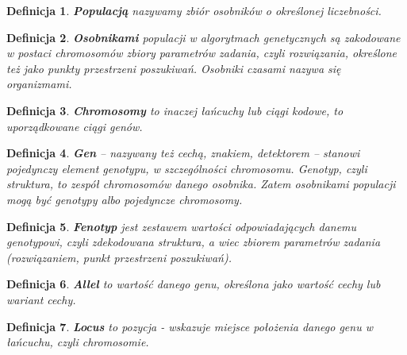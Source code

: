 \documentclass[twoside,12pt]{report}
\newtheorem{definition}{Definicja} %
\begin{document}
\begin{definition}
\textbf{Populacją} nazywamy zbiór osobników o określonej liczebności.
\end{definition}

\vspace*{10px}

\begin{definition}
\textbf{Osobnikami} populacji w algorytmach genetycznych są zakodowane w postaci chromosomów zbiory parametrów zadania, czyli rozwiązania, określone też jako punkty
przestrzeni poszukiwań. Osobniki czasami nazywa się organizmami.
\end{definition}

\vspace*{10px}

\begin{definition}
\textbf{Chromosomy} to inaczej łańcuchy lub ciągi kodowe, to uporządkowane ciągi genów.
\end{definition}

\vspace*{10px}

\begin{definition}
\textbf{Gen} – nazywany też cechą, znakiem, detektorem – stanowi pojedynczy element
genotypu, w szczególności chromosomu. Genotyp, czyli struktura, to zespół chromosomów
danego osobnika. Zatem osobnikami populacji mogą być genotypy albo
pojedyncze chromosomy.
\end{definition}

\vspace*{10px}

\begin{definition}
\textbf{Fenotyp} jest zestawem wartości odpowiadających danemu genotypowi, czyli zdekodowana
struktura, a wiec zbiorem parametrów zadania (rozwiązaniem, punkt przestrzeni
poszukiwań).
\end{definition}

\vspace*{10px}

\begin{definition}
\textbf{Allel} to wartość danego genu, określona jako wartość cechy lub wariant cechy.
\end{definition}

\vspace*{10px}

\begin{definition}
\textbf{Locus} to pozycja - wskazuje miejsce położenia danego genu w łańcuchu, czyli chromosomie.
\end{definition}
\end{document}
